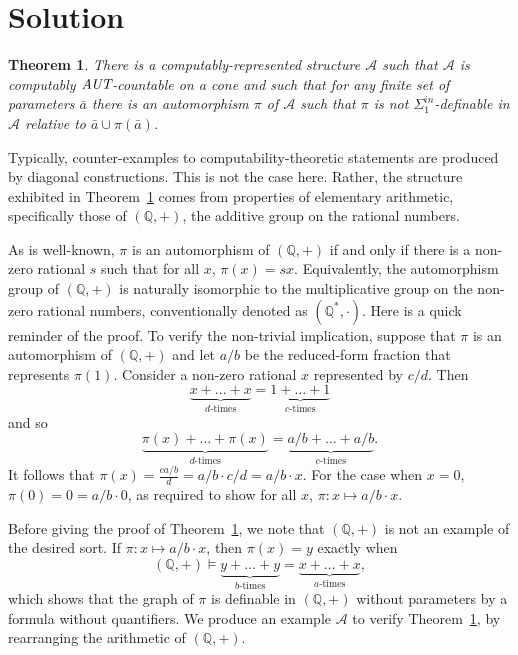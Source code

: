 \documentclass[12pt,fullpage]{article}
\newtheorem{theorem}{Theorem}[section]
\theoremstyle{definition}
\theoremstyle{remark}
\newcommand{\A}{\mathcal{A}}
\newcommand{\Q}{{\mathbb{Q}}}
\newcommand{\AUT}{\mbox{\it AUT}}
\begin{document}
\section{Solution}
\label{sec:solution}

\begin{theorem}\label{3.1}
  There is a computably-represented structure $\A$ such that $\A$ is computably $\AUT$-countable on a cone and such that for any finite set of parameters $\bar{a}$ there is an automorphism $\pi$ of $\A$ such that $\pi$ is not $\Sigma^{in}_1$-definable in $\A$ relative to $\bar{a}\cup\pi(\bar{a})$.
\end{theorem}


Typically, counter-examples to computability-theoretic statements are produced by diagonal constructions.  This is not the case here.  Rather, the structure exhibited in Theorem~\ref{3.1} comes from properties of elementary arithmetic, specifically those of $(\Q,+)$, the additive group on the rational numbers.  

As is well-known, $\pi$ is an automorphism of $(\Q,+)$ if and only if there is a non-zero rational $s$ such that for all $x$, $\pi(x)=sx$.  Equivalently, the automorphism group of $(\Q,+)$ is naturally isomorphic to the multiplicative group on the non-zero rational numbers, conventionally denoted as  $(\Q^*,\cdot)$.  Here is a quick reminder of the proof.  To verify the non-trivial implication, suppose that $\pi$ is an automorphism of $(\Q,+)$ and let $a/b$ be the reduced-form fraction that represents $\pi(1)$.  Consider a non-zero rational $x$ represented by $c/d$.  Then
\[
  \underbrace {x+\dots+x}_{\mbox{$d$-times}}=
  \underbrace {1+\dots+1}_{\mbox{$c$-times}}
\]
and so 
\[
  \underbrace  {\pi(x)+\dots+\pi(x)}_{\mbox{$d$-times}}=
  \underbrace {a/b+\dots+a/b}_{\mbox{$c$-times}}.
\]
It follows that $\pi(x)=\frac{ca/b}{d}=a/b\cdot c/d=a/b \cdot x$.  For the case when $x=0$, $\pi(0)=0=a/b\cdot 0$, as required to show for all $x$, $\pi:x\mapsto a/b \cdot x.$


Before giving the proof of Theorem~\ref{3.1}, we note that $(\Q,+)$ is not an example of the desired sort.  If $\pi:x\mapsto a/b\cdot x$, then $\pi(x)=y$ exactly when \[
  (\Q,+)\models  \underbrace {y+\dots+y}_{\mbox{$b$-times}}=
  \underbrace {x+\dots+x}_{\mbox{$a$-times}},
\]
which shows that the graph of $\pi$ is definable in $(\Q,+)$ without parameters by a formula without quantifiers.   We produce an example $\A$ to verify Theorem~\ref{3.1}, by rearranging the arithmetic of $(\Q,+)$.
\end{document}
